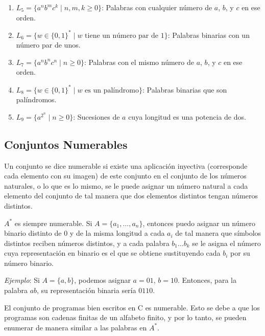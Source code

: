 \documentclass[12pt]{report} %
\providecommand{\tightlist}{%
  \setlength{\itemsep}{0pt}\setlength{\parskip}{0pt}}
\begin{document}
\begin{enumerate}
\def\labelenumi{\arabic{enumi}.}
\tightlist
\item
  \(L_5 = \{a^n b^m c^k \mid n, m, k \geq 0\}\): Palabras con cualquier
  número de \(a\), \(b\), y \(c\) en ese orden.\\
\item
  \(L_6 = \{w \in \{0, 1\}^* \mid w \text{ tiene un número par de } 1\}\):
  Palabras binarias con un número par de unos.\\
\item
  \(L_7 = \{a^n b^n c^n \mid n \geq 0\}\): Palabras con el mismo número
  de \(a\), \(b\), y \(c\) en ese orden.\\
\item
  \(L_8 = \{w \in \{0, 1\}^* \mid w \text{ es un palíndromo}\}\):
  Palabras binarias que son palíndromos.\\
\item
  \(L_9 = \{a^{2^n} \mid n \geq 0\}\): Sucesiones de \(a\) cuya longitud
  es una potencia de dos.
\end{enumerate}

\hypertarget{conjuntos-numerables}{%
\subsection{Conjuntos Numerables}\label{conjuntos-numerables}}

Un conjunto se dice numerable si existe una aplicación inyectiva
(corresponde cada elemento con su imagen) de este conjunto en el
conjunto de los números naturales, o lo que es lo mismo, se le puede
asignar un número natural a cada elemento del conjunto de tal manera que
dos elementos distintos tengan números distintos.

\begin{ejemplo}
$A^*$ es siempre numerable. Si $A = \{a_1, \ldots, a_n\}$, entonces puedo asignar un número binario distinto de 0 y de la misma longitud a cada $a_i$ de tal manera que símbolos distintos reciben números distintos, y a cada palabra $b_1 \ldots b_k$ se le asigna el número cuya representación en binario es el que se obtiene sustituyendo cada $b_i$ por su número binario.  

\textit{Ejemplo}: Si $A = \{a, b\}$, podemos asignar $a = 01$, $b = 10$. Entonces, para la palabra $ab$, su representación binaria sería $0110$.  
\end{ejemplo}

\begin{ejemplo}
El conjunto de programas bien escritos en C es numerable. Esto se debe a que los programas son cadenas finitas de un alfabeto finito, y por lo tanto, se pueden enumerar de manera similar a las palabras en $A^*$.  
\end{ejemplo}
\end{document}
